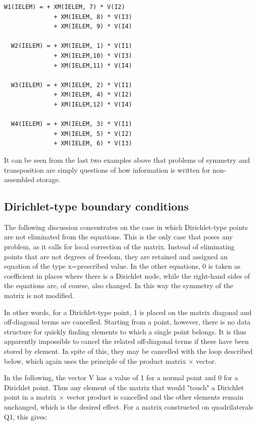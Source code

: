 \begin{lstlisting}[language=TelFortran]
  W1(IELEM) = + XM(IELEM, 7) * V(I2)
              + XM(IELEM, 8) * V(I3)
              + XM(IELEM, 9) * V(I4)

  W2(IELEM) = + XM(IELEM, 1) * V(I1)
              + XM(IELEM,10) * V(I3)
              + XM(IELEM,11) * V(I4)

  W3(IELEM) = + XM(IELEM, 2) * V(I1)
              + XM(IELEM, 4) * V(I2)
              + XM(IELEM,12) * V(I4)

  W4(IELEM) = + XM(IELEM, 3) * V(I1)
              + XM(IELEM, 5) * V(I2)
              + XM(IELEM, 6) * V(I3)
\end{lstlisting}

It can be seen from the last two examples above that problems of symmetry and
transposition are simply questions of how information is written for
non-assembled storage.

\subsection{Dirichlet-type boundary conditions}
\label{ref:dirichletbnd}

The following discussion concentrates on the case in which Dirichlet-type
points are not eliminated from the equations. This is the only case that poses
any problem, as it calls for local correction of the matrix. Instead of
eliminating points that are not degrees of freedom, they are retained and
assigned an equation of the type x=prescribed value. In the other equations, 0
is taken as coefficient in places where there is a Dirichlet node, while the
right-hand sides of the equations are, of course, also changed. In this way the
symmetry of the matrix is not modified.

In other words, for a Dirichlet-type point, 1 is placed on the matrix diagonal
and off-diagonal terms are cancelled. Starting from a point, however, there is
no data structure for quickly finding elements to which a single point belongs.
It is thus apparently impossible to cancel the related off-diagonal terms if
these have been stored by element. In spite of this, they may be cancelled with
the loop described below, which again uses the principle of the product matrix
$\times$ vector.

In the following, the vector V has a value of 1 for a normal point and 0 for a
Dirichlet point. Thus any element of the matrix that would "touch" a Dirichlet
point in a matrix $\times$ vector product is cancelled and the other elements
remain unchanged, which is the desired effect. For a matrix constructed on
quadrilaterals Q1, this gives:

